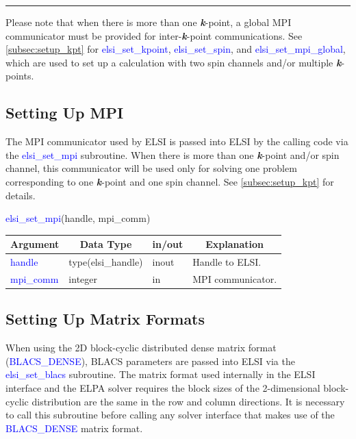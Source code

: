 \documentclass{report}
\begin{document}
\noindent\rule{18cm}{0.4pt}

\bigskip
Please note that when there is more than one \textbf{\textit{k}}-point, a global MPI communicator must be provided for inter-\textbf{\textit{k}}-point communications.  See \ref{subsec:setup_kpt} for \textcolor{blue}{elsi\_set\_kpoint}, \textcolor{blue}{elsi\_set\_spin}, and \textcolor{blue}{elsi\_set\_mpi\_global}, which are used to set up a calculation with two spin channels and/or multiple \textbf{\textit{k}}-points.

\subsection{Setting Up MPI}
\label{subsec:setup_mpi}
The MPI communicator used by ELSI is passed into ELSI by the calling code via the \textcolor{blue}{elsi\_set\_mpi} subroutine.  When there is more than one \textbf{\textit{k}}-point and/or spin channel, this communicator will be used only for solving one problem corresponding to one \textbf{\textit{k}}-point and one spin channel.  See \ref{subsec:setup_kpt} for details.\\

\begin{labeling}{\hspace{6cm}}
\item [\hspace{0.3cm} \textcolor{blue}{elsi\_set\_mpi}(handle, mpi\_comm)]
\end{labeling}

\begin{tabular}[]{|p{30mm}|p{30mm}|p{15mm}|p{90mm}|}
\hline
\multicolumn{1}{|c|}{\textbf{Argument}} & \multicolumn{1}{c|}{\textbf{Data Type}} & \multicolumn{1}{c|}{\textbf{in/out}} & \multicolumn{1}{c|}{\textbf{Explanation}}\\
\hline
\textcolor{blue}{handle}    & type(elsi\_handle) & inout & Handle to ELSI.\\
\hline
\textcolor{blue}{mpi\_comm} & integer            & in    & MPI communicator.\\
\hline
\end{tabular}

\subsection{Setting Up Matrix Formats}
\label{subsec:setup_matrix}
When using the 2D block-cyclic distributed dense matrix format (\textcolor{blue}{BLACS\_DENSE}), BLACS parameters are passed into ELSI via the \textcolor{blue}{elsi\_set\_blacs} subroutine.  The matrix format used internally in the ELSI interface and the ELPA solver requires the block sizes of the 2-dimensional block-cyclic distribution are the same in the row and column directions.  It is necessary to call this subroutine before calling any solver interface that makes use of the \textcolor{blue}{BLACS\_DENSE} matrix format.\\
\end{document}
